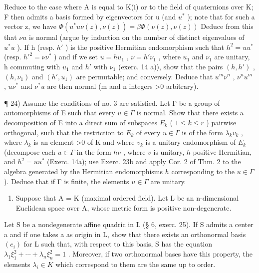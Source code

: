 Reduce to the case where A is equal to K(i) or to the field of quaternions over K; F then admits a basis formed by eigenvectors for u (and \(u^{*}\) ); note that for such a vector z, we have \(\Phi(u^{*}u\nu(z),\nu(z))=\beta\Phi(\nu(z),\nu(z))\) Deduce from this that \(\nu u\) is normal (argue by induction on the number of distinct eigenvalues of \(u^{*}u\) ). If h (resp. \(h'\) ) is the positive Hermitian endomorphism such that \(h^{2}=uu^{*}\) (resp. \(h'^{2}=\nu\nu^{*}\) ) and if we set \(u=hu_{1}\) , \(\nu=h'\nu_{1}\) , where \(u_{1}\) and \(\nu_{1}\) are unitary, h commuting with \(u_{1}\) and \(h'\) with \(\nu_{1}\) (exerc. 14 a)), show that the pairs \((h,h')\) , \((h,\nu_{1})\) and \((h',u_{1})\) are permutable; and conversely. Deduce that \(u^{m}\nu^{n}\) , \(\nu^{n}u^{m}\) , \(u\nu^{*}\) and \(\nu^{*}u\) are then normal (m and n integers \textgreater0 arbitrary).

¶ 24) Assume the conditions of no. 3 are satisfied. Let Γ be a group of automorphisms of E such that every \(u \in \Gamma\) is normal. Show that there exists a decomposition of E into a direct sum of subspaces \(E_k\) ( \(1 \leqslant k \leqslant r\) ) pairwise orthogonal, such that the restriction to \(E_k\) of every \(u \in \Gamma\) is of the form \(\lambda_k v_k\) , where \(\lambda_k\) is an element \textgreater0 of K and where \(v_k\) is a unitary endomorphism of \(E_k\) (decompose each \(u \in \Gamma\) in the form \(h\nu\) , where \(v\) is unitary, \(h\) positive Hermitian, and \(h^2 = uu^*\) (Exerc. 14a); use Exerc. 23b and apply Cor. 2 of Thm. 2 to the algebra generated by the Hermitian endomorphisms \(h\) corresponding to the \(u \in \Gamma\) ). Deduce that if Γ is finite, the elements \(u \in \Gamma\) are unitary.

\begin{enumerate}
\def\labelenumi{\arabic{enumi})}
\setcounter{enumi}{24}
\tightlist
\item
  Suppose that A = K (maximal ordered field). Let L be an n-dimensional Euclidean space over A, whose metric form is positive non-degenerate.
\end{enumerate}

Let S be a nondegenerate affine quadric in L (§ 6, exerc. 25). If S admits a center a and if one takes a as origin in L, show that there exists an orthonormal basis \((e_{i})\) for L such that, with respect to this basis, S has the equation \(\lambda_{1}\xi_{1}^{2} + \cdots + \lambda_{n}\xi_{n}^{2} = 1\) . Moreover, if two orthonormal bases have this property, the elements \(\lambda_{i} \in K\) which correspond to them are the same up to order.


